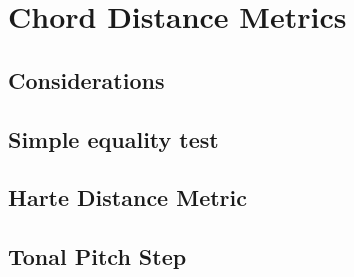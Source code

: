 \section{Chord Distance Metrics}

\subsection{Considerations}

\subsection{Simple equality test}

\subsection{Harte Distance Metric}

\subsection{Tonal Pitch Step}